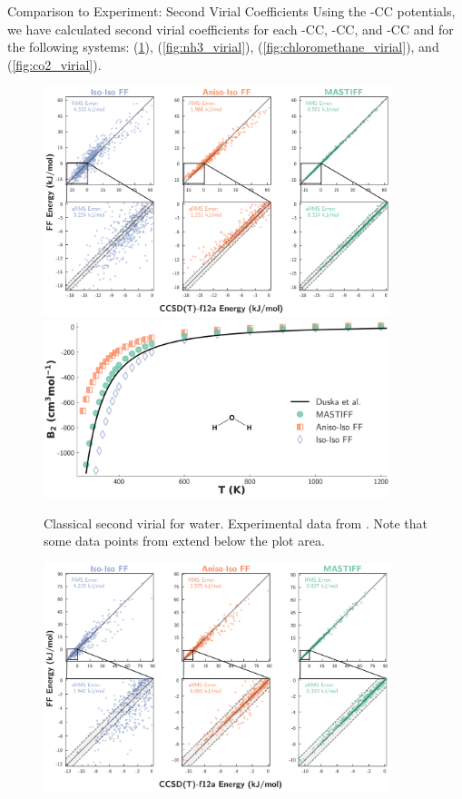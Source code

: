 \begin{subsection}{Comparison to Experiment: Second Virial Coefficients}
Using the -CC potentials, we have calculated second virial coefficients for each \isoff-CC, \isaff-CC, and
\mastiff-CC and for the following systems:
\ho (\cref{fig:h2o_virial}), 
\nh (\cref{fig:nh3_virial}), 
\cl (\cref{fig:chloromethane_virial}), and
\co (\cref{fig:co2_virial}).
%
%
    \begin{figure}[ht]
    \includegraphics[width=0.9\textwidth]{anisotropic/scatterplots/h2o_h2o_comparison.pdf}
    \includegraphics[width=0.9\textwidth]{anisotropic/virials/h2o/h2o_2nd_virial.pdf}
    \caption{
        Classical second virial for water. Experimental data from
            . 
        Note that some data points from \isoff extend below the plot area.
            }
    \label{fig:h2o_virial}
    \end{figure}
    \begin{figure}[ht]
    \includegraphics[width=0.9\textwidth]{anisotropic/scatterplots/nh3_nh3_comparison.pdf}

\end{figure}
\end{subsection}
